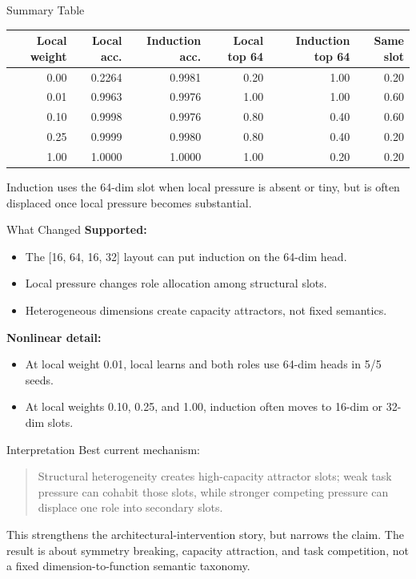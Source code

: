 \documentclass[aspectratio=169]{beamer}
\begin{document}
\begin{frame}{Summary Table}
  \begin{center}
  \scriptsize
  \begin{tabular}{rrrrrr}
    \toprule
    Local weight & Local acc. & Induction acc. & Local top 64 & Induction top 64 & Same slot \\
    \midrule
    0.00 & 0.2264 & 0.9981 & 0.20 & 1.00 & 0.20 \\
    0.01 & 0.9963 & 0.9976 & 1.00 & 1.00 & 0.60 \\
    0.10 & 0.9998 & 0.9976 & 0.80 & 0.40 & 0.60 \\
    0.25 & 0.9999 & 0.9980 & 0.80 & 0.40 & 0.20 \\
    1.00 & 1.0000 & 1.0000 & 1.00 & 0.20 & 0.20 \\
    \bottomrule
  \end{tabular}
  \end{center}

  \vspace{0.7em}
  Induction uses the 64-dim slot when local pressure is absent or tiny, but is
  often displaced once local pressure becomes substantial.
\end{frame}

\begin{frame}{What Changed}
  \textbf{Supported:}
  \begin{itemize}
    \item The [16, 64, 16, 32] layout can put induction on the 64-dim head.
    \item Local pressure changes role allocation among structural slots.
    \item Heterogeneous dimensions create capacity attractors, not fixed semantics.
  \end{itemize}

  \vspace{0.7em}
  \textbf{Nonlinear detail:}
  \begin{itemize}
    \item At local weight 0.01, local learns and both roles use 64-dim heads in 5/5 seeds.
    \item At local weights 0.10, 0.25, and 1.00, induction often moves to 16-dim or 32-dim slots.
  \end{itemize}
\end{frame}

\begin{frame}{Interpretation}
  Best current mechanism:

  \vspace{0.7em}
  \begin{quote}
    Structural heterogeneity creates high-capacity attractor slots; weak task
    pressure can cohabit those slots, while stronger competing pressure can
    displace one role into secondary slots.
  \end{quote}

  \vspace{0.7em}
  This strengthens the architectural-intervention story, but narrows the claim.
  The result is about symmetry breaking, capacity attraction, and task competition,
  not a fixed dimension-to-function semantic taxonomy.
\end{frame}
\end{document}
